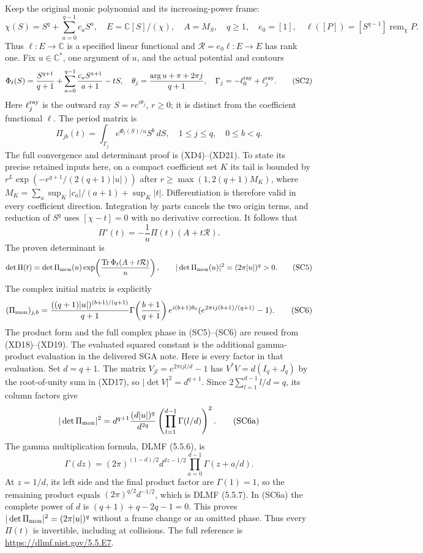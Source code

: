 \documentclass{article}
\begin{document}
Keep the original monic polynomial and its increasing-power frame:
\[
 \chi(S)=S^q+\sum_{a=0}^{q-1}c_aS^a,
 \quad E=\mathbb C[S]/(\chi),\quad A=M_S,\quad q\geq1,
 \quad e_0=[1],\quad
 \ell([P])=[S^{q-1}]\operatorname{rem}_{\chi}P.
 \tag{SC1}
\]
Thus $\ell:E\to\mathbb C$ is a specified linear functional and
$\mathcal R=e_0\ell:E\to E$ has rank one.  Fix $u\in\mathbb C^*$,
one argument of $u$, and the actual potential and contours
\[
 \Phi_t(S)=\frac{S^{q+1}}{q+1}
   +\sum_{a=0}^{q-1}\frac{c_aS^{a+1}}{a+1}-tS,
 \quad \theta_j=\frac{\arg u+\pi+2\pi j}{q+1},
 \quad\Gamma_j=-\ell_0^{\rm ray}+\ell_j^{\rm ray}.
 \tag{SC2}
\]
Here $\ell_j^{\rm ray}$ is the outward ray $S=re^{i\theta_j}$,
$r\geq0$; it is distinct from the coefficient functional $\ell$.
The period matrix is
\[
 \Pi_{jb}(t)=\int_{\Gamma_j}e^{\Phi_t(S)/u}S^b\,dS,
 \quad 1\leq j\leq q,\quad0\leq b<q.
 \tag{SC3}
\]
The full convergence and determinant proof is (XD4)--(XD21).  To
state its precise retained inputs here, on a compact coefficient set
$K$ its tail is bounded by
$r^L\exp(-r^{q+1}/(2(q+1)|u|))$ after
$r\geq\max(1,2(q+1)M_K)$, where
$M_K=\sum_a\sup_K|c_a|/(a+1)+\sup_K|t|$.
Differentiation is therefore valid in every coefficient direction.
Integration by parts cancels the two origin terms, and reduction of
$S^q$ uses $[\chi-t]=0$ with no derivative correction.  It follows that
\[
 \Pi'(t)=-\frac1u\Pi(t)(A+t\mathcal R).
 \tag{SC4}
\]
The proven determinant is
\[
 \det\Pi(t)=\det\Pi_{\rm mon}(u)
    \exp\!\left(\frac{\operatorname{Tr}\Phi_t(A+t\mathcal R)}u\right),
 \qquad |\det\Pi_{\rm mon}(u)|^2=(2\pi|u|)^q>0.
 \tag{SC5}
\]
The complex initial matrix is explicitly
\[
 (\Pi_{\rm mon})_{j,b}
 =\frac{((q+1)|u|)^{(b+1)/(q+1)}}{q+1}
   \Gamma\!\left(\frac{b+1}{q+1}\right)
   e^{i(b+1)\theta_0}
   (e^{2\pi i j(b+1)/(q+1)}-1).
 \tag{SC6}
\]
The product form and the full complex phase in (SC5)--(SC6) are
reused from (XD18)--(XD19).  The evaluated squared constant is the
additional gamma-product evaluation in the delivered SGA note.
Here is every factor in that evaluation.  Set $d=q+1$.  The matrix
$V_{jl}=e^{2\pi i jl/d}-1$ has $V^*V=d(I_q+J_q)$ by the root-of-unity
sum in (XD17), so $|\det V|^2=d^{q+1}$.  Since
$2\sum_{l=1}^{d-1}l/d=q$, its column factors give
\[
 |\det\Pi_{\rm mon}|^2
 =d^{q+1}\frac{(d|u|)^q}{d^{2q}}
       \left(\prod_{l=1}^{d-1}\Gamma(l/d)\right)^2.
 \tag{SC6a}
\]
The gamma multiplication formula, DLMF (5.5.6), is
\[
 \Gamma(dz)=(2\pi)^{(1-d)/2}d^{dz-1/2}
                   \prod_{a=0}^{d-1}\Gamma(z+a/d).
 \tag{SC6b}
\]
At $z=1/d$, its left side and the final product factor are
$\Gamma(1)=1$, so the remaining product equals
$(2\pi)^{q/2}d^{-1/2}$, which is DLMF (5.5.7).
In (SC6a) the complete power of $d$
is $(q+1)+q-2q-1=0$.  This proves
$|\det\Pi_{\rm mon}|^2=(2\pi|u|)^q$ without a frame change or
an omitted phase.  Thus every $\Pi(t)$ is invertible, including
at collisions.  The full reference is
\url{https://dlmf.nist.gov/5.5.E7}.
\end{document}
